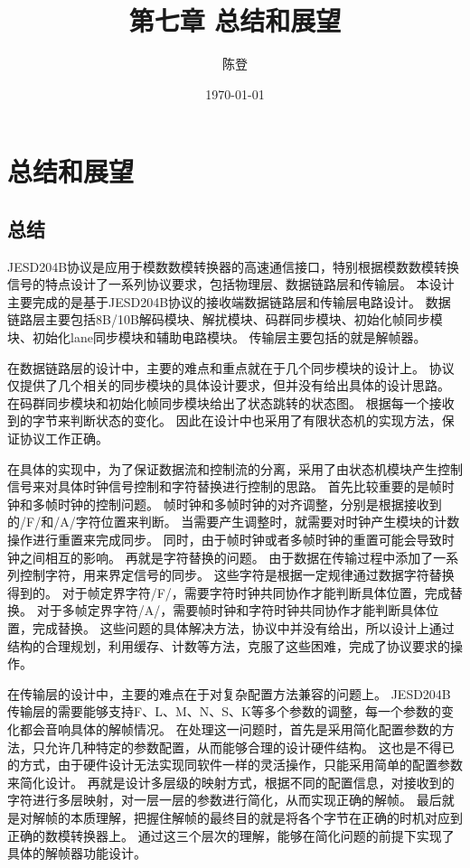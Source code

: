 \documentclass[UTF8]{ctexart}
\title{第七章 总结和展望}
\author{陈登}
\date{\today}
\begin{document}
\section{总结和展望}

\subsection{总结}

JESD204B协议是应用于模数数模转换器的高速通信接口，特别根据模数数模转换信号的特点设计了一系列协议要求，包括物理层、数据链路层和传输层。
本设计主要完成的是基于JESD204B协议的接收端数据链路层和传输层电路设计。
数据链路层主要包括8B/10B解码模块、解扰模块、码群同步模块、初始化帧同步模块、初始化lane同步模块和辅助电路模块。
传输层主要包括的就是解帧器。

在数据链路层的设计中，主要的难点和重点就在于几个同步模块的设计上。
协议仅提供了几个相关的同步模块的具体设计要求，但并没有给出具体的设计思路。
在码群同步模块和初始化帧同步模块给出了状态跳转的状态图。
根据每一个接收到的字节来判断状态的变化。
因此在设计中也采用了有限状态机的实现方法，保证协议工作正确。

在具体的实现中，为了保证数据流和控制流的分离，采用了由状态机模块产生控制信号来对具体时钟信号控制和字符替换进行控制的思路。
首先比较重要的是帧时钟和多帧时钟的控制问题。
帧时钟和多帧时钟的对齐调整，分别是根据接收到的/F/和/A/字符位置来判断。
当需要产生调整时，就需要对时钟产生模块的计数操作进行重置来完成同步。
同时，由于帧时钟或者多帧时钟的重置可能会导致时钟之间相互的影响。
再就是字符替换的问题。
由于数据在传输过程中添加了一系列控制字符，用来界定信号的同步。
这些字符是根据一定规律通过数据字符替换得到的。
对于帧定界字符/F/，需要字符时钟共同协作才能判断具体位置，完成替换。
对于多帧定界字符/A/，需要帧时钟和字符时钟共同协作才能判断具体位置，完成替换。
这些问题的具体解决方法，协议中并没有给出，所以设计上通过结构的合理规划，利用缓存、计数等方法，克服了这些困难，完成了协议要求的操作。

在传输层的设计中，主要的难点在于对复杂配置方法兼容的问题上。
JESD204B传输层的需要能够支持F、L、M、N、S、K等多个参数的调整，每一个参数的变化都会音响具体的解帧情况。
在处理这一问题时，首先是采用简化配置参数的方法，只允许几种特定的参数配置，从而能够合理的设计硬件结构。
这也是不得已的方式，由于硬件设计无法实现同软件一样的灵活操作，只能采用简单的配置参数来简化设计。
再就是设计多层级的映射方式，根据不同的配置信息，对接收到的字符进行多层映射，对一层一层的参数进行简化，从而实现正确的解帧。
最后就是对解帧的本质理解，把握住解帧的最终目的就是将各个字节在正确的时机对应到正确的数模转换器上。
通过这三个层次的理解，能够在简化问题的前提下实现了具体的解帧器功能设计。
\end{document}

